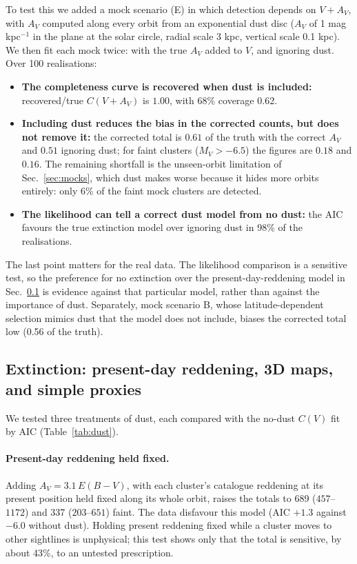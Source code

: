 \documentclass[11pt,a4paper]{article}
\newcommand{\MV}{M_V}
\begin{document}
To test this we added a mock scenario (E) in which detection depends on $V + A_V$, with $A_V$
computed along every orbit from an exponential dust disc ($A_V$ of 1 mag kpc$^{-1}$ in the plane at
the solar circle, radial scale 3 kpc, vertical scale 0.1 kpc). We then fit each mock twice: with the
true $A_V$ added to $V$, and ignoring dust. Over 100 realisations:
\begin{itemize}
\item \textbf{The completeness curve is recovered when dust is included:} recovered/true $C(V+A_V)$
is $1.00$, with 68\% coverage $0.62$.
\item \textbf{Including dust reduces the bias in the corrected counts, but does not remove it:} the
corrected total is $0.61$ of the truth with the correct $A_V$ and $0.51$ ignoring dust; for faint
clusters ($\MV>-6.5$) the figures are $0.18$ and $0.16$. The remaining shortfall is the
unseen-orbit limitation of Sec.~\ref{sec:mocks}, which dust makes worse because it hides more
orbits entirely: only 6\% of the faint mock clusters are detected.
\item \textbf{The likelihood can tell a correct dust model from no dust:} the AIC favours the true
extinction model over ignoring dust in 98\% of the realisations.
\end{itemize}
The last point matters for the real data. The likelihood comparison is a sensitive test, so the
preference for no extinction over the present-day-reddening model in Sec.~\ref{sec:ext} is evidence
against that particular model, rather than against the importance of dust. Separately, mock
scenario B, whose latitude-dependent selection mimics dust that the model does not include, biases
the corrected total low (0.56 of the truth).

\subsection{Extinction: present-day reddening, 3D maps, and simple proxies}
\label{sec:ext}

We tested three treatments of dust, each compared with the no-dust $C(V)$ fit by AIC
(Table~\ref{tab:dust}).

\paragraph{Present-day reddening held fixed.} Adding $A_V = 3.1\,E(B-V)$, with each cluster's
catalogue reddening at its present position held fixed along its whole orbit, raises the totals to
689 ($457$--$1172$) and 337 ($203$--$651$) faint. The data disfavour this model (AIC $+1.3$ against
$-6.0$ without dust). Holding present reddening fixed while a cluster moves to other sightlines is
unphysical; this test shows only that the total is sensitive, by about 43\%, to an untested
prescription.
\end{document}
